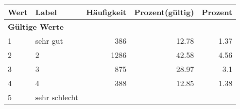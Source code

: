      \begin{longtable}{lXrrr}
     \toprule
     \textbf{Wert} & \textbf{Label} & \textbf{Häufigkeit} & \textbf{Prozent(gültig)} & \textbf{Prozent} \\
     \endhead
     \midrule
     \multicolumn{5}{l}{\textbf{Gültige Werte}}\\

     1 &
     \multicolumn{1}{X}{ sehr gut   } &


       \num{386} &
       \num[round-mode=places,round-precision=2]{12,78} &
         \num[round-mode=places,round-precision=2]{1,37} \\

     2 &
     \multicolumn{1}{X}{ 2   } &


       \num{1286} &
       \num[round-mode=places,round-precision=2]{42,58} &
         \num[round-mode=places,round-precision=2]{4,56} \\

     3 &
     \multicolumn{1}{X}{ 3   } &


       \num{875} &
       \num[round-mode=places,round-precision=2]{28,97} &
         \num[round-mode=places,round-precision=2]{3,1} \\

     4 &
     \multicolumn{1}{X}{ 4   } &


       \num{388} &
       \num[round-mode=places,round-precision=2]{12,85} &
         \num[round-mode=places,round-precision=2]{1,38} \\

     5 &
     \multicolumn{1}{X}{ sehr schlecht   } &



\end{longtable}
